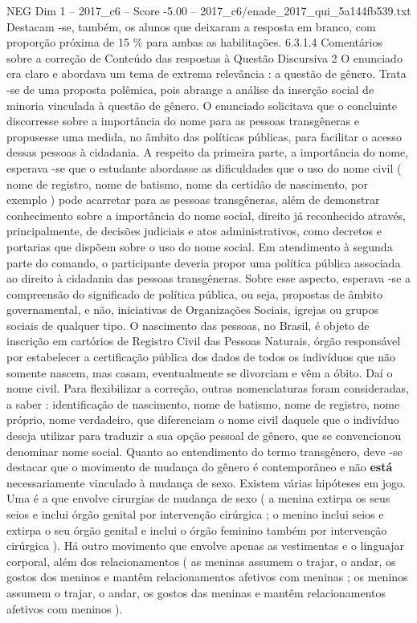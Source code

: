 \begin{textsample}{NEG Dim 1 – 2017\_c6 – Score -5.00 – 2017\_c6/enade\_2017\_qui\_5a144fb539.txt}
Destacam -se, também, os alunos que deixaram a resposta em branco, com proporção próxima de 15 \% para ambas as habilitações. 6.3.1.4 Comentários sobre a correção de Conteúdo das respostas à Questão Discursiva 2 O enunciado era claro e abordava um tema de extrema relevância : a questão de gênero.
Trata -se de uma proposta polêmica, pois abrange a análise da inserção social de minoria vinculada à questão de gênero.
O enunciado solicitava que o concluinte discorresse sobre a importância do nome para as pessoas transgêneras e propusesse uma medida, no âmbito das políticas públicas, para facilitar o acesso dessas pessoas à cidadania.
A respeito da primeira parte, a importância do nome, esperava -se que o estudante abordasse as dificuldades que o uso do nome civil ( nome de registro, nome de batismo, nome da certidão de nascimento, por exemplo ) pode acarretar para as pessoas transgêneras, além de demonstrar conhecimento sobre a importância do nome social, direito já reconhecido através, principalmente, de decisões judiciais e atos administrativos, como decretos e portarias que dispõem sobre o uso do nome social.
Em atendimento à segunda parte do comando, o participante deveria propor uma política pública associada ao direito à cidadania das pessoas transgêneras.
Sobre esse aspecto, esperava -se a compreensão do significado de política pública, ou seja, propostas de âmbito governamental, e não, iniciativas de Organizações Sociais, igrejas ou grupos sociais de qualquer tipo.
O nascimento das pessoas, no Brasil, é objeto de inscrição em cartórios de Registro Civil das Pessoas Naturais, órgão responsável por estabelecer a certificação pública dos dados de todos os indivíduos que não somente nascem, mas casam, eventualmente se divorciam e vêm a óbito.
Daí o nome civil.
Para flexibilizar a correção, outras nomenclaturas foram consideradas, a saber : identificação de nascimento, nome de batismo, nome de registro, nome próprio, nome verdadeiro, que diferenciam o nome civil daquele que o indivíduo deseja utilizar para traduzir a sua opção pessoal de gênero, que se convencionou denominar nome social.
Quanto ao entendimento do termo transgênero, deve -se destacar que o movimento de mudança do gênero é contemporâneo e não \textbf{está} necessariamente vinculado à mudança de sexo.
Existem várias hipóteses em jogo.
Uma é a que envolve cirurgias de mudança de sexo ( a menina extirpa os seus seios e inclui órgão genital por intervenção cirúrgica ; o menino inclui seios e extirpa o seu órgão genital e inclui o órgão feminino também por intervenção cirúrgica ).
Há outro movimento que envolve apenas as vestimentas e o linguajar corporal, além dos relacionamentos ( as meninas assumem o trajar, o andar, os gostos dos meninos e mantêm relacionamentos afetivos com meninas ; os meninos assumem o trajar, o andar, os gostos das meninas e mantêm relacionamentos afetivos com meninos ).

\end{textsample}
